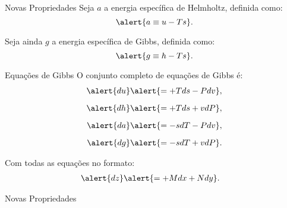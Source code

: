     \begin{frame}{Novas Propriedades}\vspace*{-1em}
        Seja \alert{$a$} a energia específica de \alert{Helmholtz}, definida como:
        \begin{equation*}
            \alert{a \equiv u - Ts}.
        \end{equation*}

        Seja ainda \alert{$g$} a energia específica de \alert{Gibbs}, definida como:
        \begin{equation*}
            \alert{g \equiv h - Ts}.
        \end{equation*}
    \end{frame}

    \begin{frame}{Equações de Gibbs}\vspace*{-1em}
        O conjunto completo de equações de Gibbs é:
        \begin{align*}
            \alert{du} &\alert{= +Tds - Pdv},
            \\[\medskipamount]
            \alert{dh} &\alert{= +Tds + vdP},
            \\[\medskipamount]
            \alert{da} &\alert{= -sdT - Pdv},
            \\[\medskipamount]
            \alert{dg} &\alert{= -sdT + vdP}.
        \end{align*}

        \vspace*\medskipamount

        Com \alert{todas} as equações no formato:
        \begin{align*}
            \alert{dz} &\alert{= +Mdx + Ndy}.
        \end{align*}
    \end{frame}

    \begin{frame}{Novas Propriedades}\vspace*{-1em}
    \end{frame}

